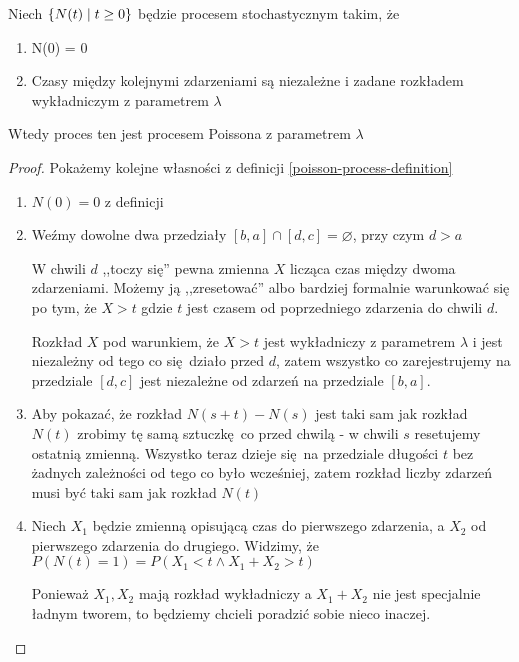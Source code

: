 \begin{theorem}[Twierdzenie 8.11 P\&C]
    Niech \(\set{N(t) \mid t \geq 0}\) będzie procesem stochastycznym takim, że
    \begin{enumerate}
        \item N(0) = 0
        \item Czasy między kolejnymi zdarzeniami są niezależne i zadane rozkładem wykładniczym 
        z parametrem \( \lambda \)
    \end{enumerate}
    Wtedy proces ten jest procesem Poissona z parametrem \( \lambda \)
\end{theorem}
\begin{proof}
    Pokażemy kolejne własności z definicji \ref{poisson-process-definition}
    
    \begin{enumerate}
        \item \( N(0) = 0 \) z definicji
        
        \item Weźmy dowolne dwa przedziały \( [b, a] \cap [d, c] = \varnothing \), przy czym \( d > a \)
        
        W chwili \( d \) ,,toczy się'' pewna zmienna \( X \) licząca czas między dwoma zdarzeniami.
        Możemy ją ,,zresetować'' albo bardziej formalnie warunkować się po tym, że \( X > t \) gdzie \( t \) jest czasem od poprzedniego zdarzenia do chwili \( d \).
        
        Rozkład \( X \) pod warunkiem, że \( X > t \) jest wykładniczy z parametrem \( \lambda \) i jest niezależny od tego co się działo przed \( d \), zatem wszystko co zarejestrujemy na przedziale \( [d, c] \) jest niezależne od zdarzeń na przedziale \( [b, a] \).
        
        \item Aby pokazać, że rozkład \( N(s + t) - N(s) \) jest taki sam jak rozkład \( N(t) \) zrobimy tę samą sztuczkę co przed chwilą - w chwili \( s \) resetujemy ostatnią zmienną. Wszystko teraz dzieje się na przedziale długości \( t \) bez żadnych zależności od tego co było wcześniej, zatem rozkład liczby zdarzeń musi być taki sam jak rozkład \( N(t) \)
        
        \item Niech \( X_1 \) będzie zmienną opisującą czas do pierwszego zdarzenia, a \( X_2 \) od pierwszego zdarzenia do drugiego. Widzimy, że \( P(N(t) = 1) = P(X_1 < t \land X_1 + X_2 > t) \)

        Ponieważ \( X_1, X_2 \) mają rozkład wykładniczy a \( X_1 + X_2 \) nie jest specjalnie ładnym tworem, to będziemy chcieli poradzić sobie nieco inaczej.
        

\end{enumerate}
\end{proof}
